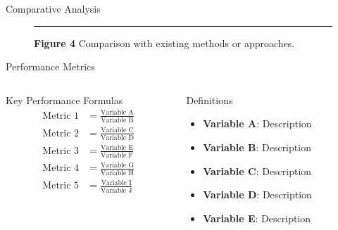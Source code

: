 \documentclass[aspectratio=169]{beamer}
\begin{document}
\begin{frame}{Comparative Analysis}
  \begin{figure}
    \centering
    \rule{0.8\textwidth}{0.5\textheight} %
    {\small \textbf{Figure 4} \textbar{} Comparison with existing methods or approaches.}
  \end{figure}
\end{frame}

\begin{frame}{Performance Metrics}
  \begin{columns}[T]
    \begin{column}{0.55\textwidth}
      \begin{block}{Key Performance Formulas}
        {\scriptsize
        \begin{align}
          \text{Metric 1} &= \frac{\text{Variable A}}{\text{Variable B}} \\[0.2em]
          \text{Metric 2} &= \frac{\text{Variable C}}{\text{Variable D}} \\[0.2em]
          \text{Metric 3} &= \frac{\text{Variable E}}{\text{Variable F}} \\[0.2em]
          \text{Metric 4} &= \frac{\text{Variable G}}{\text{Variable H}} \\[0.2em]
          \text{Metric 5} &= \frac{\text{Variable I}}{\text{Variable J}}
        \end{align}
        }
      \end{block}
    \end{column}
    \begin{column}{0.43\textwidth}
      \begin{block}{\small Definitions}
        {\footnotesize
        \begin{itemize}
          \item \textbf{Variable A}: Description
          \item \textbf{Variable B}: Description  
          \item \textbf{Variable C}: Description
          \item \textbf{Variable D}: Description
          \item \textbf{Variable E}: Description
        \end{itemize}
        }
      \end{block}
    \end{column}
  \end{columns}
\end{frame}
\end{document}
